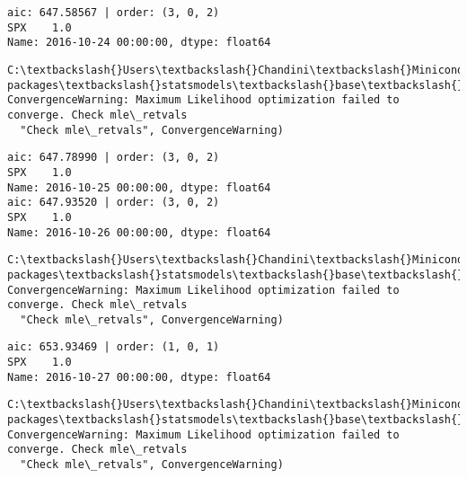 \documentclass[11pt]{article}
\begin{document}
    \begin{Verbatim}[commandchars=\\\{\}]
aic: 647.58567 | order: (3, 0, 2)
SPX    1.0
Name: 2016-10-24 00:00:00, dtype: float64

    \end{Verbatim}

    \begin{Verbatim}[commandchars=\\\{\}]
C:\textbackslash{}Users\textbackslash{}Chandini\textbackslash{}Miniconda3\textbackslash{}envs\textbackslash{}auquan\textbackslash{}lib\textbackslash{}site-packages\textbackslash{}statsmodels\textbackslash{}base\textbackslash{}model.py:496: ConvergenceWarning: Maximum Likelihood optimization failed to converge. Check mle\_retvals
  "Check mle\_retvals", ConvergenceWarning)

    \end{Verbatim}

    \begin{Verbatim}[commandchars=\\\{\}]
aic: 647.78990 | order: (3, 0, 2)
SPX    1.0
Name: 2016-10-25 00:00:00, dtype: float64
aic: 647.93520 | order: (3, 0, 2)
SPX    1.0
Name: 2016-10-26 00:00:00, dtype: float64

    \end{Verbatim}

    \begin{Verbatim}[commandchars=\\\{\}]
C:\textbackslash{}Users\textbackslash{}Chandini\textbackslash{}Miniconda3\textbackslash{}envs\textbackslash{}auquan\textbackslash{}lib\textbackslash{}site-packages\textbackslash{}statsmodels\textbackslash{}base\textbackslash{}model.py:496: ConvergenceWarning: Maximum Likelihood optimization failed to converge. Check mle\_retvals
  "Check mle\_retvals", ConvergenceWarning)

    \end{Verbatim}

    \begin{Verbatim}[commandchars=\\\{\}]
aic: 653.93469 | order: (1, 0, 1)
SPX    1.0
Name: 2016-10-27 00:00:00, dtype: float64

    \end{Verbatim}

    \begin{Verbatim}[commandchars=\\\{\}]
C:\textbackslash{}Users\textbackslash{}Chandini\textbackslash{}Miniconda3\textbackslash{}envs\textbackslash{}auquan\textbackslash{}lib\textbackslash{}site-packages\textbackslash{}statsmodels\textbackslash{}base\textbackslash{}model.py:496: ConvergenceWarning: Maximum Likelihood optimization failed to converge. Check mle\_retvals
  "Check mle\_retvals", ConvergenceWarning)

    \end{Verbatim}
\end{document}
